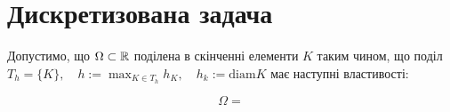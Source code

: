 
\section {Дискретизована задача}

Допустимо, що $\Omega \subset \mathbb{R}$ поділена в скінченні елементи $K$ таким чином, що поділ
$
	T_h=\lbrace K \rbrace, \quad
	h := \max_{K \in T_h}h_K, \quad
	h_k := \mbox{diam} K
$
має наступні властивості:

\begin{equation}
	\Omega =
\end{equation}


